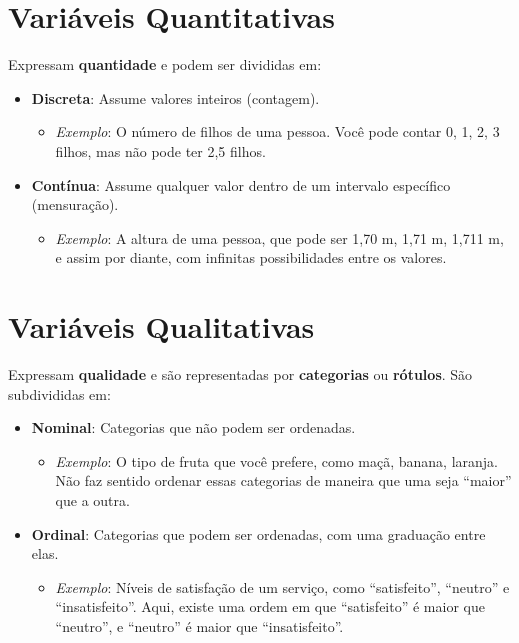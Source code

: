 \documentclass[
]{book}
\providecommand{\tightlist}{%
  \setlength{\itemsep}{0pt}\setlength{\parskip}{0pt}}
\begin{document}
\section{Variáveis Quantitativas}\label{variuxe1veis-quantitativas}

Expressam \textbf{quantidade} e podem ser divididas em:

\begin{itemize}
\tightlist
\item
  \textbf{Discreta}: Assume valores inteiros (contagem).

  \begin{itemize}
  \tightlist
  \item
    \emph{Exemplo}: O número de filhos de uma pessoa. Você pode contar 0, 1, 2, 3 filhos, mas não pode ter 2,5 filhos.
  \end{itemize}
\item
  \textbf{Contínua}: Assume qualquer valor dentro de um intervalo específico (mensuração).

  \begin{itemize}
  \tightlist
  \item
    \emph{Exemplo}: A altura de uma pessoa, que pode ser 1,70 m, 1,71 m, 1,711 m, e assim por diante, com infinitas possibilidades entre os valores.
  \end{itemize}
\end{itemize}

\section{Variáveis Qualitativas}\label{variuxe1veis-qualitativas}

Expressam \textbf{qualidade} e são representadas por \textbf{categorias} ou \textbf{rótulos}. São subdivididas em:

\begin{itemize}
\tightlist
\item
  \textbf{Nominal}: Categorias que não podem ser ordenadas.

  \begin{itemize}
  \tightlist
  \item
    \emph{Exemplo}: O tipo de fruta que você prefere, como maçã, banana, laranja. Não faz sentido ordenar essas categorias de maneira que uma seja ``maior'' que a outra.
  \end{itemize}
\item
  \textbf{Ordinal}: Categorias que podem ser ordenadas, com uma graduação entre elas.

  \begin{itemize}
  \tightlist
  \item
    \emph{Exemplo}: Níveis de satisfação de um serviço, como ``satisfeito'', ``neutro'' e ``insatisfeito''. Aqui, existe uma ordem em que ``satisfeito'' é maior que ``neutro'', e ``neutro'' é maior que ``insatisfeito''.
  \end{itemize}
\end{itemize}
\end{document}
